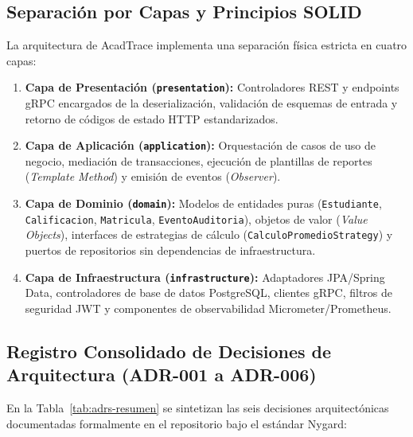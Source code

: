 \documentclass[11pt,a4paper]{article}
\begin{document}
\subsection{Separaci\'on por Capas y Principios SOLID}
La arquitectura de AcadTrace implementa una separaci\'on f\'isica estricta en cuatro capas:
\begin{enumerate}
  \item \textbf{Capa de Presentaci\'on (\texttt{presentation}):} Controladores REST y endpoints gRPC encargados de la deserializaci\'on, validaci\'on de esquemas de entrada y retorno de c\'odigos de estado HTTP estandarizados.
  \item \textbf{Capa de Aplicaci\'on (\texttt{application}):} Orquestaci\'on de casos de uso de negocio, mediaci\'on de transacciones, ejecuci\'on de plantillas de reportes (\textit{Template Method}) y emisi\'on de eventos (\textit{Observer}).
  \item \textbf{Capa de Dominio (\texttt{domain}):} Modelos de entidades puras (\texttt{Estudiante}, \texttt{Calificacion}, \texttt{Matricula}, \texttt{EventoAuditoria}), objetos de valor (\textit{Value Objects}), interfaces de estrategias de c\'alculo (\texttt{CalculoPromedioStrategy}) y puertos de repositorios sin dependencias de infraestructura.
  \item \textbf{Capa de Infraestructura (\texttt{infrastructure}):} Adaptadores JPA/Spring Data, controladores de base de datos PostgreSQL, clientes gRPC, filtros de seguridad JWT y componentes de observabilidad Micrometer/Prometheus.
\end{enumerate}

\subsection{Registro Consolidado de Decisiones de Arquitectura (ADR-001 a ADR-006)}
En la Tabla~\ref{tab:adrs-resumen} se sintetizan las seis decisiones arquitect\'onicas documentadas formalmente en el repositorio bajo el est\'andar Nygard:
\end{document}
